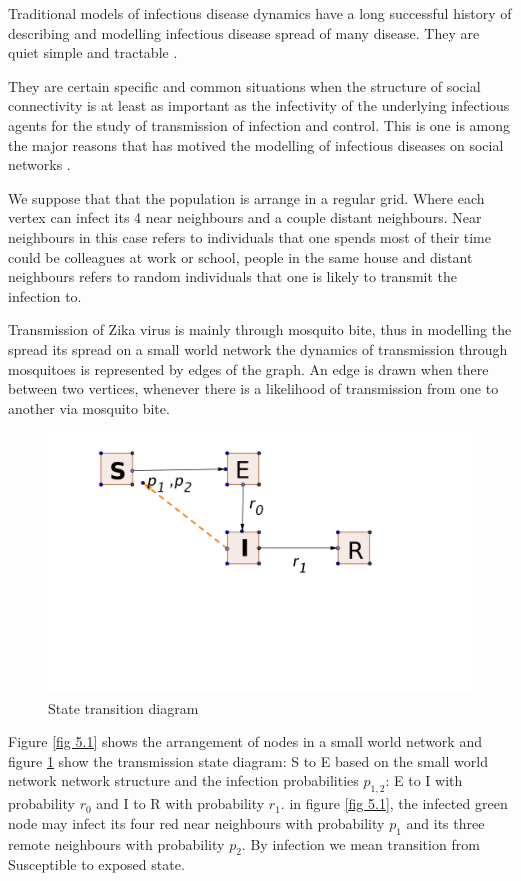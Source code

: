 Traditional models of infectious disease dynamics have a long successful history of describing and modelling infectious disease spread of many disease. They are quiet simple and tractable \citep{fu2013propagation}.

They are certain specific and common situations when the structure of social connectivity is at least as important as the infectivity of the underlying infectious agents for the study of transmission of infection and control. This is one is among the major  reasons that has motived the modelling of infectious diseases on social networks \cite{fu2013propagation}.

 We suppose that that the population is arrange in a regular grid.  Where each vertex  can infect its 4 near neighbours and a couple distant neighbours. Near neighbours in this case refers to individuals that one spends most of their time could be colleagues at work or school, people in the same house and distant neighbours refers to random individuals that one is likely to transmit the infection to. 
 
 Transmission of Zika virus is mainly through mosquito bite, thus in modelling the spread its spread on a small world network the dynamics of transmission through mosquitoes is represented by edges of the graph. An edge is drawn when there between two  vertices, whenever there is a likelihood of transmission from one to another via mosquito bite.
 \newpage
 \begin{figure}[h!]
 \centering
 \includegraphics[scale=0.4]{images/swseir.png}
 \caption{State transition diagram} \label{fig 5.2}
 \end{figure}
 
 
 
Figure  \ref{fig 5.1}  shows the arrangement of nodes in a small world network and  figure \ref{fig 5.2} show the transmission state diagram: S to E based on the small world network network structure and the infection probabilities $p_{1,2}$: E to I with probability $r_0$ and I to R with probability $r_1$. in figure \ref{fig 5.1}, the infected green node may infect its four red near neighbours with probability $p_1$ and its three remote neighbours with probability $p_2$. By infection we mean transition from Susceptible to exposed state.

